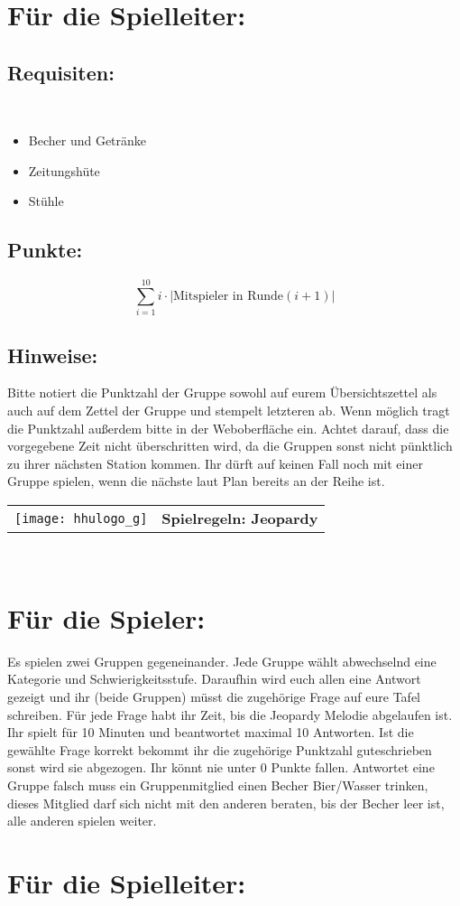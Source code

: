 \documentclass[a4paper,10pt]{article}
\def\spielf{Jeopardy}
\newcommand{\unten}{
 Bitte notiert die Punktzahl der Gruppe sowohl auf eurem Übersichtszettel als auch auf dem Zettel der Gruppe und stempelt letzteren ab. Wenn möglich tragt die Punktzahl außerdem bitte in der Weboberfläche ein.
 Achtet darauf, dass die vorgegebene Zeit nicht überschritten wird, da die Gruppen sonst nicht pünktlich zu ihrer nächsten Station kommen. Ihr dürft auf keinen Fall noch mit einer Gruppe spielen, wenn die nächste laut Plan bereits an der Reihe ist.
}
\begin{document}
\section*{Für die Spielleiter:}
\subsection*{Requisiten:}\\
\begin{itemize}
 \item Becher und Getränke
 \item Zeitungshüte
 \item Stühle 
\end{itemize}
\subsection*{Punkte:}
$$\sum\limits_{i=1}^{10}i \cdot |\mbox{Mitspieler in Runde} (i+1)|$$

\subsection*{Hinweise:}
\unten

\newpage


  \begin{tabularx}{\textwidth}{lc}
    \texttt{[image: hhulogo\_g]}
  & {\Huge \textbf{Spielregeln: \spielf}}
  \end{tabularx}\\

\Large
\section*{Für die Spieler:}
Es spielen zwei Gruppen gegeneinander. Jede Gruppe wählt abwechselnd eine Kategorie und Schwierigkeitsstufe. Daraufhin wird euch allen eine Antwort gezeigt und ihr (beide Gruppen) müsst die zugehörige Frage auf eure Tafel schreiben. Für jede Frage habt ihr Zeit, bis die Jeopardy Melodie abgelaufen ist. Ihr spielt für 10 Minuten und beantwortet maximal 10 Antworten. Ist die gewählte Frage korrekt bekommt ihr die zugehörige Punktzahl guteschrieben sonst wird sie abgezogen. Ihr könnt nie unter 0 Punkte fallen. Antwortet eine Gruppe falsch muss ein Gruppenmitglied einen Becher Bier/Wasser trinken, dieses Mitglied darf sich nicht mit den anderen beraten, bis der Becher leer ist, alle anderen spielen weiter.

\section*{Für die Spielleiter:}
\end{document}
